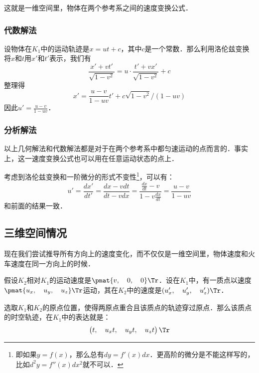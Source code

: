 这就是一维空间里，物体在两个参考系之间的速度变换公式．

\subsubsection{代数解法}

设物体在$K_1$中的运动轨迹是$x=ut+c$，其中$c$是一个常数．那么利用洛伦兹变换将$x$和$t$用$x'$和$t'$表示，我们有
\begin{equation}
\frac{x'+vt'}{\sqrt{1-v^2}}=u\cdot\frac{t'+vx'}{\sqrt{1-v^2}}+c
\end{equation}
整理得
\begin{equation}
x'=\frac{u-v}{1-uv}t'+c\sqrt{1-v^2}/(1-uv)
\end{equation}
因此$u'=\frac{u-v}{1-uv}$．

\subsubsection{分析解法}

以上几何解法和代数解法都是对于在两个参考系中都匀速运动的点而言的．事实上，这一速度变换公式也可以用在任意运动状态的点上．

考虑到洛伦兹变换和一阶微分的形式不变性\footnote{即如果$y=f(x)$，那么总有$dy=f'(x)dx$．更高阶的微分是不能这样写的，比如$d^2y=f''(x)dx^2$就不可以．}，可以有：
\begin{equation}
u'=\frac{dx'}{dt'}=\frac{dx-vdt}{dt-vdx}=\frac{\frac{dx}{dt}-v}{1-v\frac{dx}{dt}}=\frac{u-v}{1-uv}
\end{equation}
和前面的结果一致．

\subsection{三维空间情况}

现在我们尝试推导所有方向上的速度变化，而不仅仅是一维空间里，物体速度和火车速度在同一方向上的时候．

假设$K_2$相对$K_1$的运动速度是$\pmat{v,\quad 0,\quad 0}\Tr$．设在$K_1$中，有一质点以速度$\pmat{u_x,\quad u_y,\quad u_z}\Tr$运动，其在$K_2$中的速度是$(u_x',\quad u_y',\quad u_z')\Tr$．

选取$K_1$和$K_2$的原点位置，使得两原点重合且该质点的轨迹穿过原点．那么该质点的时空轨迹，在$K_1$中的表达就是：
\begin{equation}\label{RelVel_eq2}
\left(\begin{matrix}t,\quad u_xt,\quad u_yt,\quad u_zt\end{matrix} \right)\Tr 
\end{equation}

